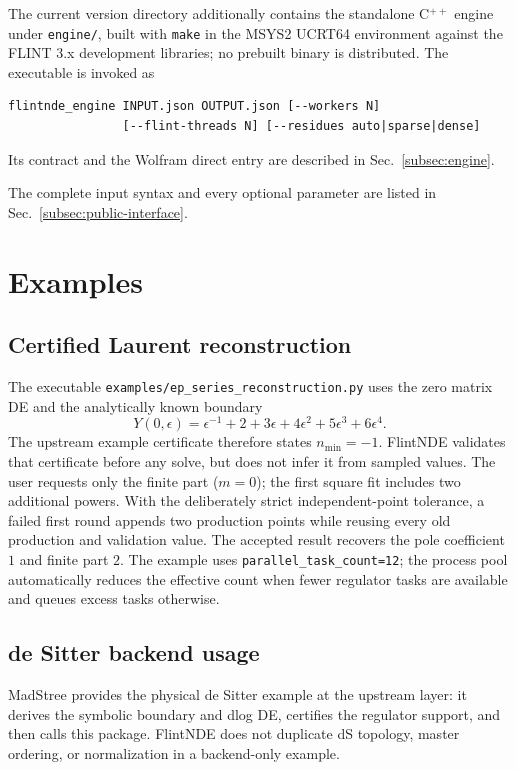 \documentclass[11pt]{article}
\begin{document}
The current version directory additionally contains the standalone C$^{++}$ engine under
\texttt{engine/}, built with \texttt{make} in the MSYS2 UCRT64 environment against the FLINT
3.x development libraries; no prebuilt binary is distributed.  The executable is invoked as
\begin{verbatim}
flintnde_engine INPUT.json OUTPUT.json [--workers N]
                [--flint-threads N] [--residues auto|sparse|dense]
\end{verbatim}
Its contract and the Wolfram direct entry are described in
Sec.~\ref{subsec:engine}.

The complete input syntax and every optional parameter are listed in
Sec.~\ref{subsec:public-interface}.

\section{Examples}
\label{sec:examples}

\subsection{Certified Laurent reconstruction}

The executable \texttt{examples/ep\_series\_reconstruction.py} uses the zero matrix DE and
the analytically known boundary
\begin{equation}
 Y(0,\epsilon)=\epsilon^{-1}+2+3\epsilon+4\epsilon^2+5\epsilon^3+6\epsilon^4.
\end{equation}
The upstream example certificate therefore states $n_{\min}=-1$.  FlintNDE validates that
certificate before any solve, but does not infer it from sampled values.  The user requests only
the finite part ($m=0$); the first square fit includes two additional powers.  With the deliberately
strict independent-point tolerance, a failed first round appends two production points while
reusing every old production and validation value.  The accepted result recovers the pole
coefficient $1$ and finite part $2$.  The example uses
\texttt{parallel\_task\_count=12}; the process pool automatically reduces the effective count
when fewer regulator tasks are available and queues excess tasks otherwise.

\subsection{de Sitter backend usage}

MadStree provides the physical de Sitter example at the upstream layer: it derives the symbolic
boundary and dlog DE, certifies the regulator support, and then calls this package.  FlintNDE does
not duplicate dS topology, master ordering, or normalization in a backend-only example.
\end{document}

